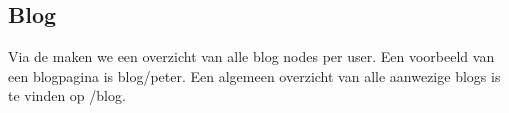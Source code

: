 \subsection{Blog}\label{blog}

Via de  maken we een overzicht van alle blog nodes per user. Een voorbeeld van een blogpagina is blog/peter. Een algemeen overzicht van alle aanwezige blogs is te vinden op /blog. 